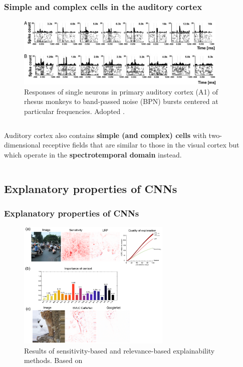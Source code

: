 \documentclass[a4paper,9pt]{beamer}
\theoremstyle{mytheoremstyle}
\begin{document}
\begin{frame}
\frametitle{Simple and complex cells in the auditory cortex}
\begin{figure}
\begin{center}
  \includegraphics[width=0.9\textwidth]{res/simple_cells_auditory_cortes.png}
\end{center}
	\caption{Responses of single neurons in primary auditory cortex (A1) of rhesus monkeys to band-passed noise (BPN) bursts centered at particular frequencies. Adopted \parencite{tian2013}.}
\end{figure}
\begin{columns}
\scriptsize{
\begin{exampleblock}{}
Auditory cortex also contains \textbf{simple (and complex) cells} with two-dimensional receptive fields that are similar to those in the visual cortex but which operate in the \textbf{spectrotemporal domain} instead.
\end{exampleblock}
}
\end{columns}
\end{frame}

\subsection{Explanatory properties of CNNs}

\begin{frame}
\frametitle{Explanatory properties of CNNs}
\begin{figure}
\begin{center}
  \includegraphics[width=0.65\textwidth]{res/sensitivity_vs_relevance}
\end{center}
	\caption{Results of sensitivity-based and relevance-based explainability methods. Based on \parencite{samek2016}}
\end{figure}
\end{frame}
\end{document}
